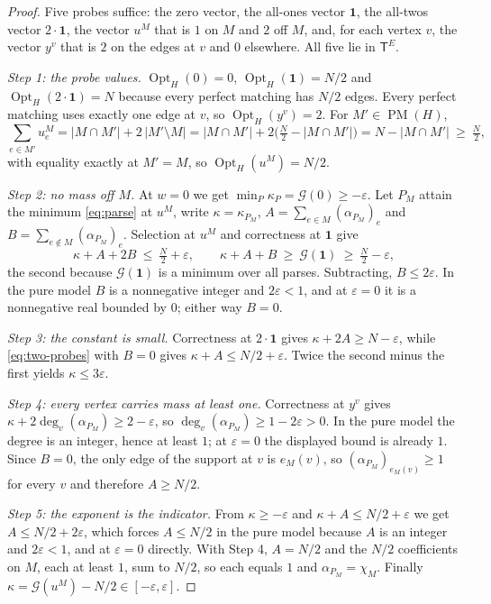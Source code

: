 \documentclass[11pt]{article}
\newcommand{\Opt}{\operatorname{Opt}}
\newcommand{\PM}{\operatorname{PM}}
\begin{document}
\begin{proof}
Five probes suffice: the zero vector, the all-ones vector $\mathbf1$, the
all-twos vector $2\cdot\mathbf1$, the vector $u^{M}$ that is $1$ on $M$ and $2$
off $M$, and, for each vertex $v$, the vector $y^{v}$ that is $2$ on the edges
at $v$ and $0$ elsewhere.  All five lie in $\mathsf T^{E}$.

\emph{Step 1: the probe values.}
$\Opt_H(0)=0$, $\Opt_H(\mathbf1)=N/2$ and $\Opt_H(2\cdot\mathbf1)=N$ because
every perfect matching has $N/2$ edges.  Every perfect matching uses exactly one
edge at $v$, so $\Opt_H(y^{v})=2$.  For $M'\in\PM(H)$,
\[
  \sum_{e\in M'}u^{M}_e
  =|M\cap M'|+2\,|M'\setminus M|
  =|M\cap M'|+2\bigl(\tfrac N2-|M\cap M'|\bigr)
  =N-|M\cap M'|
  \ \ge\ \tfrac N2 ,
\]
with equality exactly at $M'=M$, so $\Opt_H(u^{M})=N/2$.

\emph{Step 2: no mass off $M$.}
At $w=0$ we get $\min_P\kappa_P=\mathcal G(0)\ge-\varepsilon$.  Let $P_M$ attain
the minimum \eqref{eq:parse} at $u^{M}$, write $\kappa=\kappa_{P_M}$,
$A=\sum_{e\in M}(\alpha_{P_M})_e$ and $B=\sum_{e\notin M}(\alpha_{P_M})_e$.
Selection at $u^{M}$ and correctness at $\mathbf1$ give
\begin{equation}
  \kappa+A+2B\ \le\ \tfrac N2+\varepsilon,
  \qquad
  \kappa+A+B\ \ge\ \mathcal G(\mathbf1)\ \ge\ \tfrac N2-\varepsilon ,
  \label{eq:two-probes}
\end{equation}
the second because $\mathcal G(\mathbf1)$ is a minimum over all parses.
Subtracting, $B\le2\varepsilon$.  In the pure model $B$ is a nonnegative integer
and $2\varepsilon<1$, and at $\varepsilon=0$ it is a nonnegative real bounded by
$0$; either way $B=0$.

\emph{Step 3: the constant is small.}
Correctness at $2\cdot\mathbf1$ gives $\kappa+2A\ge N-\varepsilon$, while
\eqref{eq:two-probes} with $B=0$ gives $\kappa+A\le N/2+\varepsilon$.  Twice the
second minus the first yields $\kappa\le3\varepsilon$.

\emph{Step 4: every vertex carries mass at least one.}
Correctness at $y^{v}$ gives $\kappa+2\deg_v(\alpha_{P_M})\ge2-\varepsilon$, so
$\deg_v(\alpha_{P_M})\ge1-2\varepsilon>0$.  In the pure model the degree is an
integer, hence at least $1$; at $\varepsilon=0$ the displayed bound is already
$1$.  Since $B=0$, the only edge of the support at $v$ is $e_M(v)$, so
$(\alpha_{P_M})_{e_M(v)}\ge1$ for every $v$ and therefore $A\ge N/2$.

\emph{Step 5: the exponent is the indicator.}
From $\kappa\ge-\varepsilon$ and $\kappa+A\le N/2+\varepsilon$ we get
$A\le N/2+2\varepsilon$, which forces $A\le N/2$ in the pure model because $A$ is
an integer and $2\varepsilon<1$, and at $\varepsilon=0$ directly.  With Step 4,
$A=N/2$ and the $N/2$ coefficients on $M$, each at least $1$, sum to $N/2$, so
each equals $1$ and $\alpha_{P_M}=\chi_M$.  Finally
$\kappa=\mathcal G(u^{M})-N/2\in[-\varepsilon,\varepsilon]$.
\end{proof}
\end{document}
